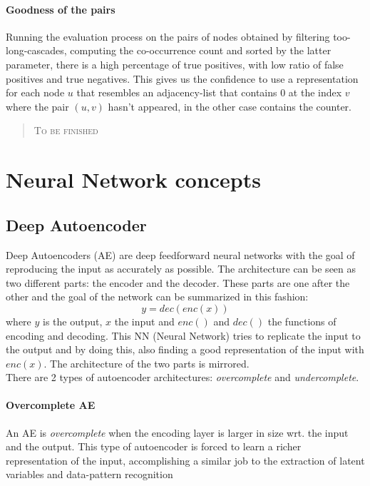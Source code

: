 \documentclass{article}
\begin{document}
			\paragraph{Goodness of the pairs}
			Running the evaluation process on the pairs of nodes obtained by filtering too-long-cascades, computing the co-occurrence count and sorted by the latter parameter, there is a high percentage of true positives, with low ratio of false positives and true negatives. This gives us the confidence to use a representation for each node $u$ that resembles an adjacency-list that contains 0 at the index $v$ where the pair $(u,v)$ hasn't appeared, in the other case contains the counter.\\
			\begin{quote}
				\centering
				\textsc{To be finished}\\
			\end{quote}
			
		\section{Neural Network concepts}
			\subsection{Deep Autoencoder}
			Deep Autoencoders (AE) are deep feedforward neural networks with the goal of reproducing the input as accurately as possible. The architecture can be seen as two different parts: the encoder and the decoder. These parts are one after the other and the goal of the network can be summarized in this fashion:
			$$y=dec(enc(x))$$
			where $y$ is the output, $x$ the input and $enc()$ and $dec()$ the functions of encoding and decoding. This NN (Neural Network) tries to replicate the input to the output and by doing this, also finding a good representation of the input with $enc(x)$. The architecture of the two parts is mirrored.\\
			There are 2 types of autoencoder architectures: \textit{overcomplete} and \textit{undercomplete}.
			\paragraph{Overcomplete AE}
			An AE is \textit{overcomplete} when the encoding layer is larger in size wrt. the input and the output. This type of autoencoder is forced to learn a richer representation of the input, accomplishing a similar job to the extraction of latent variables and data-pattern recognition
\end{document}
